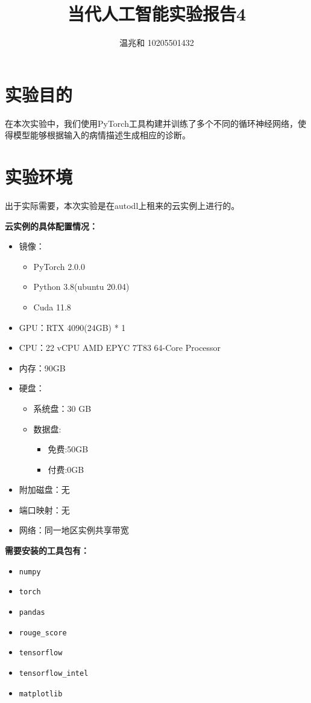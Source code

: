 \documentclass{article}
\title{当代人工智能实验报告4}
\author{温兆和 10205501432}
\begin{document}
\maketitle

\section{实验目的}
在本次实验中，我们使用PyTorch工具构建并训练了多个不同的循环神经网络，使得模型能够根据输入的病情描述生成相应的诊断。

\section{实验环境}
出于实际需要，本次实验是在autodl上租来的云实例上进行的。

\textbf{云实例的具体配置情况：}
\begin{spacing}{0.5}
\begin{itemize}
\item 镜像：
    \begin{itemize}
        \item PyTorch 2.0.0
        \item Python 3.8(ubuntu 20.04)
        \item Cuda 11.8
    \end{itemize} 
\item GPU：RTX 4090(24GB) * 1 
\item CPU：22 vCPU AMD EPYC 7T83 64-Core Processor
\item 内存：90GB
\item 硬盘：
    \begin{itemize}
        \item 系统盘：30 GB
        \item 数据盘:
            \begin{itemize}
                \item 免费:50GB
                \item 付费:0GB
            \end{itemize}
    \end{itemize}
\item 附加磁盘：无
\item 端口映射：无
\item 网络：同一地区实例共享带宽
\end{itemize}
\end{spacing}

\textbf{需要安装的工具包有：}
\begin{spacing}{0.5}
\begin{itemize}
\item \lstinline|numpy|
\item \lstinline|torch|
\item \lstinline|pandas|
\item \lstinline|rouge_score|
\item \lstinline|tensorflow|
\item \lstinline|tensorflow_intel|
\item \lstinline|matplotlib|
\end{itemize}
\end{spacing}
\end{document}
